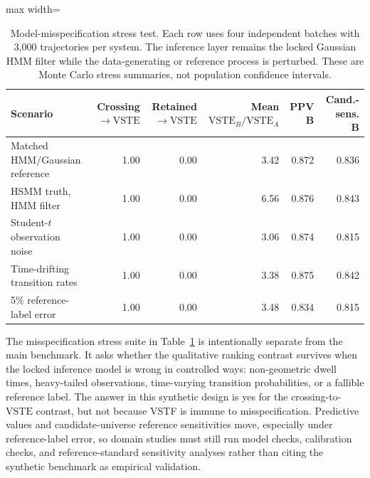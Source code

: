 \documentclass[11pt,a4paper]{article}
\newcommand{\VSTE}{\ensuremath{\mathrm{VSTE}}}
\newcommand{\1}{\mathbf{1}}
\begin{document}
\begin{table}[h]
\centering
\caption{Model-misspecification stress test. Each row uses four independent batches with 3,000 trajectories per system. The inference layer remains the locked Gaussian HMM filter while the data-generating or reference process is perturbed. These are Monte Carlo stress summaries, not population confidence intervals.}
\label{tab:model-misspecification}
\small
\begin{adjustbox}{max width=\linewidth}
\begin{tabular}{lrrrrr}
\toprule
Scenario & Crossing$\to$\VSTE{} & Retained$\to$\VSTE{} & Mean $\VSTE_B/\VSTE_A$ & PPV B & Cand.-sens. B \\
\midrule
Matched HMM/Gaussian reference & 1.00 & 0.00 & 3.42 & 0.872 & 0.836 \\
HSMM truth, HMM filter & 1.00 & 0.00 & 6.56 & 0.876 & 0.843 \\
Student-$t$ observation noise & 1.00 & 0.00 & 3.06 & 0.874 & 0.815 \\
Time-drifting transition rates & 1.00 & 0.00 & 3.38 & 0.875 & 0.842 \\
5\% reference-label error & 1.00 & 0.00 & 3.48 & 0.834 & 0.815 \\
\bottomrule
\end{tabular}
\end{adjustbox}
\end{table}

The misspecification stress suite in Table~\ref{tab:model-misspecification} is intentionally separate from the main benchmark. It asks whether the qualitative ranking contrast survives when the locked inference model is wrong in controlled ways: non-geometric dwell times, heavy-tailed observations, time-varying transition probabilities, or a fallible reference label. The answer in this synthetic design is yes for the crossing-to-\VSTE{} contrast, but not because VSTF is immune to misspecification. Predictive values and candidate-universe reference sensitivities move, especially under reference-label error, so domain studies must still run model checks, calibration checks, and reference-standard sensitivity analyses rather than citing the synthetic benchmark as empirical validation.
\end{document}
